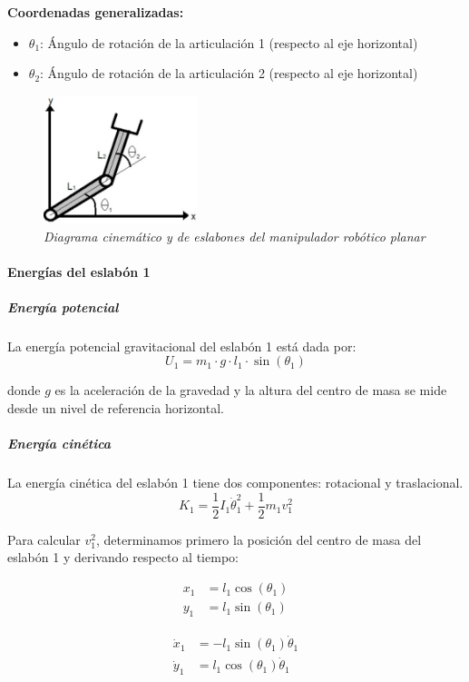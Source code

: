 \textbf{Coordenadas generalizadas:}
\begin{itemize}[label=$\bullet$]
    \item $\theta_1$: Ángulo de rotación de la articulación 1 (respecto al eje horizontal)
    \item $\theta_2$: Ángulo de rotación de la articulación 2 (respecto al eje horizontal)
\end{itemize}
\begin{figure}[H]
    \centering
    \includegraphics[width=0.4\textwidth]{img/DCL_brazo.png}
    \caption{\textit{Diagrama cinemático y de eslabones del manipulador robótico planar}}
    \label{fig:DCL_brazo}
\end{figure}
\paragraph{Energías del eslabón 1}
\subparagraph{Energía potencial}

La energía potencial gravitacional del eslabón 1 está dada por:
\begin{equation}
U_1 = m_1 \cdot g \cdot l_1 \cdot \sin(\theta_1)
\end{equation}

donde $g$ es la aceleración de la gravedad y la altura del centro de masa se mide desde un nivel de referencia horizontal.

\subparagraph{Energía cinética}

La energía cinética del eslabón 1 tiene dos componentes: rotacional y traslacional.
\begin{equation}
K_1 = \frac{1}{2} I_1 \dot{\theta}_1^2 + \frac{1}{2} m_1 v_1^2
\end{equation}

Para calcular $v_1^2$, determinamos primero la posición del centro de masa del eslabón 1 y derivando respecto al tiempo:

\noindent
\begin{minipage}{0.48\textwidth}
\begin{align}
x_1 &= l_1 \cos(\theta_1) \\
y_1 &= l_1 \sin(\theta_1)
\end{align}
\end{minipage}
\hfill
\begin{minipage}{0.48\textwidth}
\begin{align}
\dot{x}_1 &= -l_1 \sin(\theta_1) \dot{\theta}_1 \\
\dot{y}_1 &= l_1 \cos(\theta_1) \dot{\theta}_1
\end{align}
\end{minipage}

